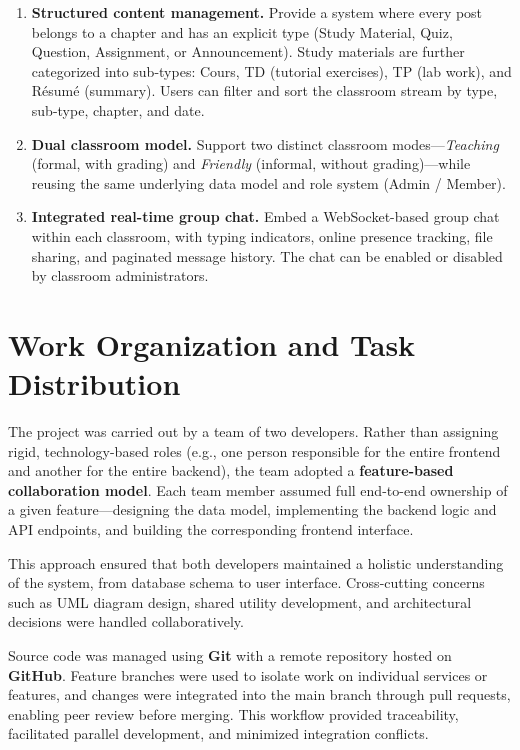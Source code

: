 \begin{enumerate}[label=\textbf{O\arabic*.}]
  \item \textbf{Structured content management.}
        Provide a system where every post belongs to a chapter and has an explicit type (Study Material, Quiz, Question, Assignment, or Announcement).
        Study materials are further categorized into sub-types: Cours, TD (tutorial exercises), TP (lab work), and Résumé (summary).
        Users can filter and sort the classroom stream by type, sub-type, chapter, and date.

  \item \textbf{Dual classroom model.}
        Support two distinct classroom modes---\emph{Teaching} (formal, with grading) and \emph{Friendly} (informal, without grading)---while reusing the same underlying data model and role system (Admin / Member).

  \item \textbf{Integrated real-time group chat.}
        Embed a WebSocket-based group chat within each classroom, with typing indicators, online presence tracking, file sharing, and paginated message history.
        The chat can be enabled or disabled by classroom administrators.
\end{enumerate}

\section{Work Organization and Task Distribution}
\label{sec:organization}

The project was carried out by a team of two developers.
Rather than assigning rigid, technology-based roles (e.g., one person responsible for the entire frontend and another for the entire backend), the team adopted a \textbf{feature-based collaboration model}.
Each team member assumed full end-to-end ownership of a given feature---designing the data model, implementing the backend logic and API endpoints, and building the corresponding frontend interface.

This approach ensured that both developers maintained a holistic understanding of the system, from database schema to user interface.
Cross-cutting concerns such as UML diagram design, shared utility development, and architectural decisions were handled collaboratively.

Source code was managed using \textbf{Git} with a remote repository hosted on \textbf{GitHub}.
Feature branches were used to isolate work on individual services or features, and changes were integrated into the main branch through pull requests, enabling peer review before merging.
This workflow provided traceability, facilitated parallel development, and minimized integration conflicts.

